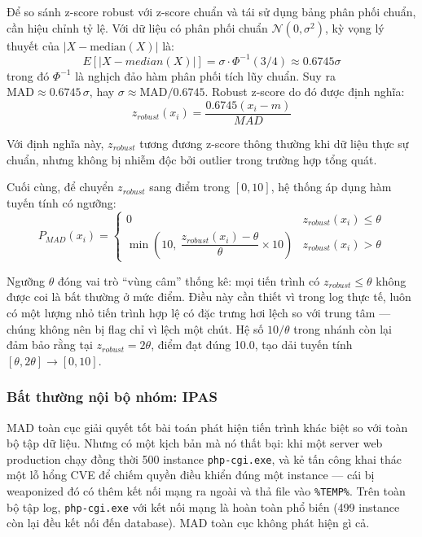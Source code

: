 \documentclass[../main.tex]{subfiles}
\begin{document}
Để so sánh z-score robust với z-score chuẩn và tái sử dụng bảng phân phối chuẩn, cần hiệu chỉnh tỷ lệ. Với dữ liệu có phân phối chuẩn $\mathcal{N}(0, \sigma^2)$, kỳ vọng lý thuyết của $|X - \text{median}(X)|$ là:
\begin{equation}
    E[|X - median(X)|] = \sigma \cdot \Phi^{-1}(3/4) \approx 0.6745\sigma \tag{1.7}
\end{equation}
trong đó $\Phi^{-1}$ là nghịch đảo hàm phân phối tích lũy chuẩn. Suy ra $\text{MAD} \approx 0.6745\,\sigma$, hay $\sigma \approx \text{MAD}/0.6745$. Robust z-score do đó được định nghĩa:
\begin{equation}
    z_{robust}(x_i) = \frac{0.6745(x_i - m)}{MAD} \tag{1.8}
\end{equation}

Với định nghĩa này, $z_{robust}$ tương đương z-score thông thường khi dữ liệu thực sự chuẩn, nhưng không bị nhiễm độc bởi outlier trong trường hợp tổng quát.

Cuối cùng, để chuyển $z_{robust}$ sang điểm trong $[0, 10]$, hệ thống áp dụng hàm tuyến tính có ngưỡng:
\begin{equation}
    P_{MAD}(x_i) = \begin{cases} 0 & z_{robust}(x_i) \le \theta \\ \min\!\left(10,\ \dfrac{z_{robust}(x_i) - \theta}{\theta} \times 10\right) & z_{robust}(x_i) > \theta \end{cases} \tag{1.9}
\end{equation}

Ngưỡng $\theta$ đóng vai trò ``vùng câm'' thống kê: mọi tiến trình có $z_{robust} \le \theta$ không được coi là bất thường ở mức điểm. Điều này cần thiết vì trong log thực tế, luôn có một lượng nhỏ tiến trình hợp lệ có đặc trưng hơi lệch so với trung tâm — chúng không nên bị flag chỉ vì lệch một chút. Hệ số $10/\theta$ trong nhánh còn lại đảm bảo rằng tại $z_{robust} = 2\theta$, điểm đạt đúng 10.0, tạo dải tuyến tính $[\theta, 2\theta] \to [0, 10]$.

\subsubsection{Bất thường nội bộ nhóm: IPAS}
\label{subsubsection:2.4.2.2}

MAD toàn cục giải quyết tốt bài toán phát hiện tiến trình khác biệt so với toàn bộ tập dữ liệu. Nhưng có một kịch bản mà nó thất bại: khi một server web production chạy đồng thời 500 instance \texttt{php-cgi.exe}, và kẻ tấn công khai thác một lỗ hổng CVE để chiếm quyền điều khiển đúng một instance — cái bị weaponized đó có thêm kết nối mạng ra ngoài và thả file vào \texttt{\%TEMP\%}. Trên toàn bộ tập log, \texttt{php-cgi.exe} với kết nối mạng là hoàn toàn phổ biến (499 instance còn lại đều kết nối đến database). MAD toàn cục không phát hiện gì cả.
\end{document}
